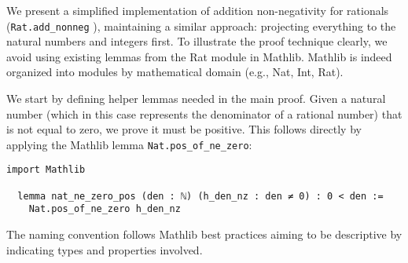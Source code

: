 \begin{example}
  We present a simplified implementation of addition
  non-negativity for rationals (\lstinline[language=lean]|Rat.add_nonneg| ),
  maintaining a similar approach: projecting everything to the natural numbers and
  integers first. To illustrate the proof technique clearly, we avoid using existing lemmas
  from the Rat module in Mathlib.
  Mathlib is indeed organized into modules by mathematical
  domain (e.g., Nat, Int, Rat).

  We start by defining helper lemmas needed in the main proof.
  Given a natural number
  (which in this case represents the denominator of a rational number) that is not
  equal to zero, we prove it must be positive. This follows directly by
  applying the Mathlib lemma \lstinline[language=lean]|Nat.pos_of_ne_zero|:
  \newpage
  \begin{lstlisting}[language=lean]
  import Mathlib

  lemma nat_ne_zero_pos (den : ℕ) (h_den_nz : den ≠ 0) : 0 < den :=
    Nat.pos_of_ne_zero h_den_nz
\end{lstlisting}
  The naming convention follows Mathlib
  best practices aiming to be descriptive by indicating
  types and properties involved.


\end{example}
